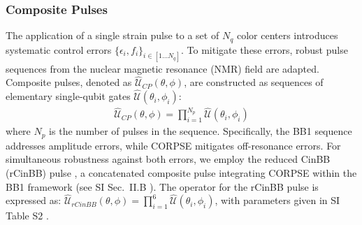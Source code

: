 \documentclass[%
 reprint,
 superscriptaddress,
 amsmath,amssymb,
 aps,
 prx,
]{revtex4-2}
\begin{document}
\subsubsection{Composite Pulses}

The application of a single strain pulse to a set of $N_q$ color centers introduces systematic control errors $\{\epsilon_i, f_i\}_{i\in [1...N_q]}$.
To mitigate these errors, robust pulse sequences from the nuclear magnetic resonance (NMR) field are adapted. Composite pulses, denoted as $\hat{\mathcal{U}}_{CP}(\theta, \phi)$, are constructed as sequences of elementary single-qubit gates $\hat{\mathcal{U}}(\theta_i, \phi_i)$:  
\begin{align}
\hat{\mathcal{U}}_{CP}(\theta, \phi) = \prod_{i=1}^{N_p} \hat{\mathcal{U}}(\theta_i, \phi_i)
\end{align}
where $N_p$ is the number of pulses in the sequence. Specifically, the BB1 sequence \cite{WIMPERIS1994221} addresses amplitude errors, while CORPSE \cite{PhysRevA.67.042308} mitigates off-resonance errors. For simultaneous robustness against both errors, we employ the reduced CinBB (rCinBB) pulse \cite{Bando2012Concatenated}, a concatenated composite pulse integrating CORPSE within the BB1 framework (see SI Sec.~II.B \cite{googleSI_Programmable_Quantum_Matter_2025Google}). The operator for the rCinBB pulse is expressed as:
$\hat{\mathcal{U}}_{rCinBB}(\theta,\phi) = \prod_{i=1}^{6} \hat{\mathcal{U}}(\theta_i, \phi_i)$,
with parameters given in SI Table S2 \cite{googleSI_Programmable_Quantum_Matter_2025Google}.  
\end{document}
